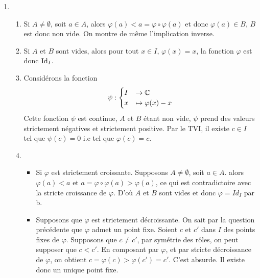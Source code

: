\begin{enumerate}
\item 
\begin{enumerate}
\item Si $A\neq\emptyset$, soit $a\in A$, alors $\varphi(a)<a=\varphi\circ\varphi(a)$ et donc $\varphi(a)\in B$, $B$ est donc non vide. On montre de même l'implication inverse.
\item Si $A$ et $B$ sont vides, alors pour tout $x\in I$,  $\varphi(x)=x$, la fonction $\varphi$ est donc $\operatorname{Id}_I$.
\item Considérons la fonction $$\psi : \begin{cases}I &\rightarrow \mathbb{C} \\ x &\mapsto \varphi(x)-x \end{cases}$$
Cette fonction $\psi$ est continue, $A$ et $B$ étant non vide, $\psi$ prend des valeurs strictement négatives et strictement positive. Par le TVI, il existe  $c\in I$ tel que $\psi(c)=0$ i.e tel que $\varphi(c)=c$.
\item \begin{itemize}
\item Si $\varphi$ est strictement croissante. Supposons $A\neq\emptyset$, soit $a\in A$. alors $\varphi(a)<a$ et $a=\varphi\circ\varphi(a)>\varphi(a)$, ce qui est contradictoire avec la stricte croissance de $\varphi$. D'où $A$ et $B$ sont vides et donc $\varphi=Id_I$ par b.
\item   Supposons que  $\varphi$ est strictement décroissante. On sait par la question précédente que $\varphi$ admet un point fixe.  Soient $c$ et $c'$ dans $I$ des points fixes de $\varphi$. Supposons que $c\neq c'$, par symétrie des rôles, on peut supposer que $c<c'$. En composant par $\varphi$, et par stricte décroissance de $\varphi$, on obtient $c=\varphi(c)>\varphi(c')=c'$. C'est absurde. Il existe donc un unique point fixe.
\end{itemize}


\end{enumerate}
\end{enumerate}
